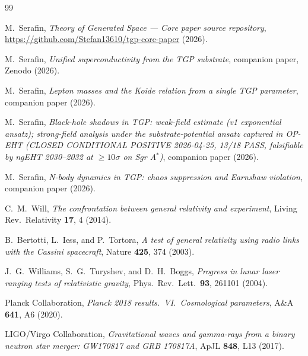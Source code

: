 \documentclass[11pt,a4paper]{article}
\begin{document}
\begin{thebibliography}{99}

M.~Serafin, \emph{Theory of Generated Space --- Core paper source repository},
\url{https://github.com/Stefan13610/tgp-core-paper} (2026).

M.~Serafin,
\emph{Unified superconductivity from the TGP substrate},
companion paper, Zenodo (2026).

M.~Serafin,
\emph{Lepton masses and the Koide relation from a single TGP parameter},
companion paper (2026).

M.~Serafin,
\emph{Black-hole shadows in TGP: weak-field estimate (v1 exponential
ansatz); strong-field analysis under the substrate-potential ansatz
captured in OP-EHT (CLOSED CONDITIONAL POSITIVE 2026-04-25, 13/18 PASS,
falsifiable by ngEHT 2030--2032 at $\geq 10\sigma$ on Sgr A$^*$)},
companion paper (2026).

M.~Serafin,
\emph{N-body dynamics in TGP: chaos suppression and Earnshaw violation},
companion paper (2026).

C.~M.~Will,
\emph{The confrontation between general relativity and experiment},
Living Rev.\ Relativity \textbf{17}, 4 (2014).

B.~Bertotti, L.~Iess, and P.~Tortora,
\emph{A test of general relativity using radio links with the Cassini spacecraft},
Nature \textbf{425}, 374 (2003).

J.~G.~Williams, S.~G.~Turyshev, and D.~H.~Boggs,
\emph{Progress in lunar laser ranging tests of relativistic gravity},
Phys.\ Rev.\ Lett.\ \textbf{93}, 261101 (2004).

Planck Collaboration,
\emph{Planck 2018 results.\ VI.\ Cosmological parameters},
A\&A \textbf{641}, A6 (2020).

LIGO/Virgo Collaboration,
\emph{Gravitational waves and gamma-rays from a binary neutron star merger:
GW170817 and GRB 170817A}, ApJL \textbf{848}, L13 (2017).

\end{thebibliography}
\end{document}
